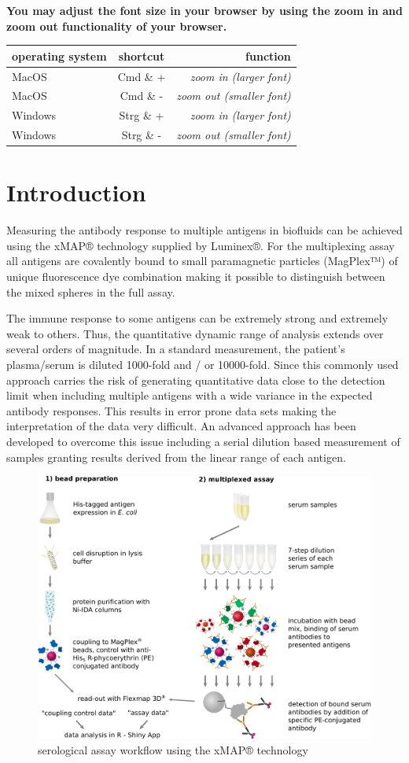 \documentclass[]{book}
\theoremstyle{definition}
\theoremstyle{definition}
\theoremstyle{definition}
\theoremstyle{remark}
\begin{document}
\textbf{You may adjust the font size in your browser by using the zoom
in and zoom out functionality of your browser.}

\begin{longtable}[]{@{}lcr@{}}
\toprule
operating system & shortcut & function\tabularnewline
\midrule
\endhead
MacOS & Cmd \& + & \emph{zoom in (larger font)}\tabularnewline
MacOS & Cmd \& - & \emph{zoom out (smaller font)}\tabularnewline
Windows & Strg \& + & \emph{zoom in (larger font)}\tabularnewline
Windows & Strg \& - & \emph{zoom out (smaller font)}\tabularnewline
\bottomrule
\end{longtable}

\chapter{Introduction}\label{introduction}

Measuring the antibody response to multiple antigens in biofluids can be
achieved using the xMAP® technology supplied by Luminex®. For the
multiplexing assay all antigens are covalently bound to small
paramagnetic particles (MagPlex™) of unique fluorescence dye combination
making it possible to distinguish between the mixed spheres in the full
assay.

The immune response to some antigens can be extremely strong and
extremely weak to others. Thus, the quantitative dynamic range of
analysis extends over several orders of magnitude. In a standard
measurement, the patient's plasma/serum is diluted 1000-fold and / or
10000-fold. Since this commonly used approach carries the risk of
generating quantitative data close to the detection limit when including
multiple antigens with a wide variance in the expected antibody
responses. This results in error prone data sets making the
interpretation of the data very difficult. An advanced approach has been
developed to overcome this issue including a serial dilution based
measurement of samples granting results derived from the linear range of
each antigen.

\begin{figure}
\includegraphics[width=84.01in]{figures/serological_assay_workflow} \caption{serological assay workflow using the xMAP® technology}\label{fig:workflow}
\end{figure}
\end{document}
